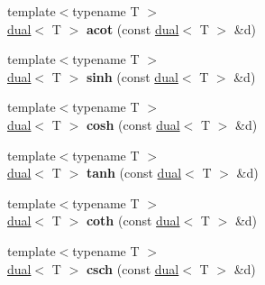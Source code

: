\begin{DoxyCompactItemize}
\item 
\hypertarget{namespace_d_r_d_s_p_aa2cda92490ead06ec066a72dd5d8870a}{{\footnotesize template$<$typename T $>$ }\\\hyperlink{struct_d_r_d_s_p_1_1dual}{dual}$<$ T $>$ {\bfseries acot} (const \hyperlink{struct_d_r_d_s_p_1_1dual}{dual}$<$ T $>$ \&d)}\label{namespace_d_r_d_s_p_aa2cda92490ead06ec066a72dd5d8870a}

\item 
\hypertarget{namespace_d_r_d_s_p_ad2113780999bbd3895e3d79b137aac36}{{\footnotesize template$<$typename T $>$ }\\\hyperlink{struct_d_r_d_s_p_1_1dual}{dual}$<$ T $>$ {\bfseries sinh} (const \hyperlink{struct_d_r_d_s_p_1_1dual}{dual}$<$ T $>$ \&d)}\label{namespace_d_r_d_s_p_ad2113780999bbd3895e3d79b137aac36}

\item 
\hypertarget{namespace_d_r_d_s_p_a44964811b291ca1095905668ca95e4e7}{{\footnotesize template$<$typename T $>$ }\\\hyperlink{struct_d_r_d_s_p_1_1dual}{dual}$<$ T $>$ {\bfseries cosh} (const \hyperlink{struct_d_r_d_s_p_1_1dual}{dual}$<$ T $>$ \&d)}\label{namespace_d_r_d_s_p_a44964811b291ca1095905668ca95e4e7}

\item 
\hypertarget{namespace_d_r_d_s_p_a07150f168f0a943b7d3c5cae83dff808}{{\footnotesize template$<$typename T $>$ }\\\hyperlink{struct_d_r_d_s_p_1_1dual}{dual}$<$ T $>$ {\bfseries tanh} (const \hyperlink{struct_d_r_d_s_p_1_1dual}{dual}$<$ T $>$ \&d)}\label{namespace_d_r_d_s_p_a07150f168f0a943b7d3c5cae83dff808}

\item 
\hypertarget{namespace_d_r_d_s_p_a8e82d06e9a4b307ef3dc03fcf3ec908a}{{\footnotesize template$<$typename T $>$ }\\\hyperlink{struct_d_r_d_s_p_1_1dual}{dual}$<$ T $>$ {\bfseries coth} (const \hyperlink{struct_d_r_d_s_p_1_1dual}{dual}$<$ T $>$ \&d)}\label{namespace_d_r_d_s_p_a8e82d06e9a4b307ef3dc03fcf3ec908a}

\item 
\hypertarget{namespace_d_r_d_s_p_a5af6296c47f4aabc1f85b64e65f91033}{{\footnotesize template$<$typename T $>$ }\\\hyperlink{struct_d_r_d_s_p_1_1dual}{dual}$<$ T $>$ {\bfseries csch} (const \hyperlink{struct_d_r_d_s_p_1_1dual}{dual}$<$ T $>$ \&d)}\label{namespace_d_r_d_s_p_a5af6296c47f4aabc1f85b64e65f91033}


\end{DoxyCompactItemize}
